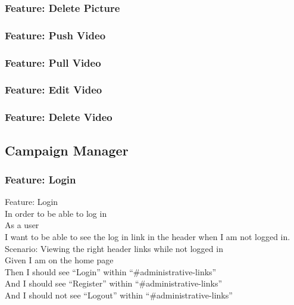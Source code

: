 \documentclass[12pt]{article}
\begin{document}
\subsubsection{Feature: Delete Picture}

\subsubsection{Feature: Push Video}
\subsubsection{Feature: Pull Video}
\subsubsection{Feature: Edit Video}
\subsubsection{Feature: Delete Video}

\subsection{Campaign Manager}

\subsubsection{Feature: Login}

Feature: Login \\
  In order to be able to log in \\
  As a user \\
  I want to be able to see the log in link in the header when I am not logged in. \\

Scenario: Viewing the right header links while not logged in  \\
  Given I am on the home page \\
  Then I should see ``Login'' within ``\#administrative-links'' \\
  And I should see ``Register'' within ``\#administrative-links'' \\
  And I should not see ``Logout'' within ``\#administrative-links'' \\
\end{document}
